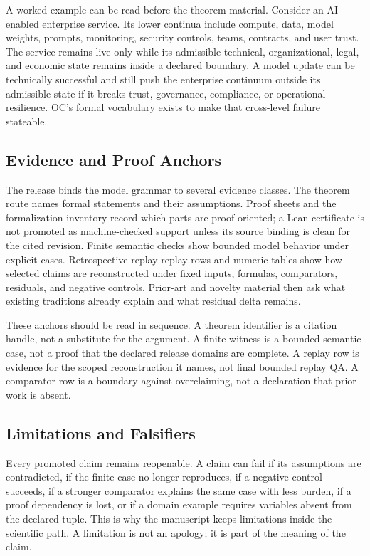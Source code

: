 A worked example can be read before the theorem material. Consider an AI-enabled enterprise service. Its lower continua include compute, data, model weights, prompts, monitoring, security controls, teams, contracts, and user trust. The service remains live only while its admissible technical, organizational, legal, and economic state remains inside a declared boundary. A model update can be technically successful and still push the enterprise continuum outside its admissible state if it breaks trust, governance, compliance, or operational resilience. OC's formal vocabulary exists to make that cross-level failure stateable.

\subsection{Evidence and Proof Anchors}
The release binds the model grammar to several evidence classes. The theorem route names formal statements and their assumptions. Proof sheets and the formalization inventory record which parts are proof-oriented; a Lean certificate is not promoted as machine-checked support unless its source binding is clean for the cited revision. Finite semantic checks show bounded model behavior under explicit cases. Retrospective replay replay rows and numeric tables show how selected claims are reconstructed under fixed inputs, formulas, comparators, residuals, and negative controls. Prior-art and novelty material then ask what existing traditions already explain and what residual delta remains.

These anchors should be read in sequence. A theorem identifier is a citation handle, not a substitute for the argument. A finite witness is a bounded semantic case, not a proof that the declared release domains are complete. A replay row is evidence for the scoped reconstruction it names, not final bounded replay QA. A comparator row is a boundary against overclaiming, not a declaration that prior work is absent.

\subsection{Limitations and Falsifiers}
Every promoted claim remains reopenable. A claim can fail if its assumptions are contradicted, if the finite case no longer reproduces, if a negative control succeeds, if a stronger comparator explains the same case with less burden, if a proof dependency is lost, or if a domain example requires variables absent from the declared tuple. This is why the manuscript keeps limitations inside the scientific path. A limitation is not an apology; it is part of the meaning of the claim.

